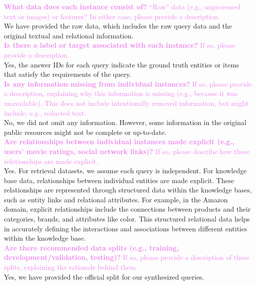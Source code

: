 \documentclass{article}
\newcommand{\sectioncolor}{Violet}
\begin{document}
    \textcolor{\sectioncolor}{\textbf{
    What data does each instance consist of?
    }
    “Raw” data (e.g., unprocessed text or images) or features? In either case,
    please provide a description.
    } \\
    We have provided the raw data, which includes the raw query data and the original textual and relational information. \\
    
    \textcolor{\sectioncolor}{\textbf{
    Is there a label or target associated with each instance?
    }
    If so, please provide a description.
    } \\
    Yes, the answer IDs for each query indicate the ground truth entities or items that satisfy the requirements of the query. \\
    
    \textcolor{\sectioncolor}{\textbf{
    Is any information missing from individual instances?
    }
    If so, please provide a description, explaining why this information is
    missing (e.g., because it was unavailable). This does not include
    intentionally removed information, but might include, e.g., redacted text.
    } \\
    No, we did not omit any information. However, some information in the original public resources might not be complete or up-to-date. \\
    
    \textcolor{\sectioncolor}{\textbf{
    Are relationships between individual instances made explicit (e.g., users’
    movie ratings, social network links)?
    }
    If so, please describe how these relationships are made explicit.
    } \\
    Yes. For retrieval datasets, we assume each query is independent. For knowledge base data, relationships between individual entities are made explicit. These relationships are represented through structured data within the knowledge bases, such as entity links and relational attributes. For example, in the Amazon domain, explicit relationships include the connections between products and their categories, brands, and attributes like color. This structured relational data helps in accurately defining the interactions and associations between different entities within the knowledge base. \\
    
    \textcolor{\sectioncolor}{\textbf{
    Are there recommended data splits (e.g., training, development/validation,
    testing)?
    }
    If so, please provide a description of these splits, explaining the
    rationale behind them.
    } \\
    Yes, we have provided the official split for our synthesized queries. \\
    
\end{document}
